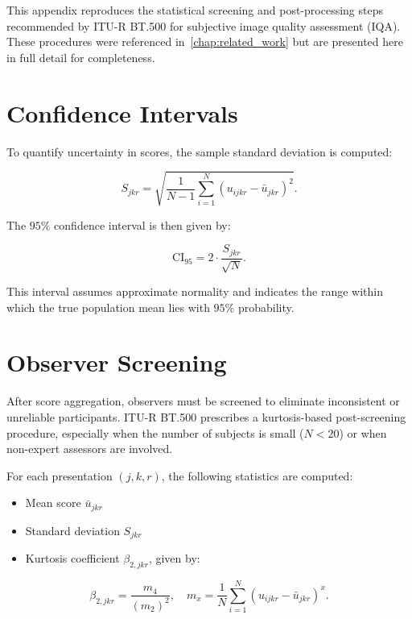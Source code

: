 This appendix reproduces the statistical screening and post-processing steps recommended by ITU-R BT.500 for subjective image quality assessment (IQA). These procedures were referenced in~\autoref{chap:related_work} but are presented here in full detail for completeness.

\section{Confidence Intervals}

To quantify uncertainty in scores, the sample standard deviation is computed:

\begin{equation}
S_{jkr} = \sqrt{\frac{1}{N - 1} \sum_{i=1}^{N} \left( u_{ijkr} - \bar{u}_{jkr} \right)^2}.
\end{equation}

The $95\%$ confidence interval is then given by:

\begin{equation}
\text{CI}_{95} = 2 \cdot \frac{S_{jkr}}{\sqrt{N}}.
\end{equation}

This interval assumes approximate normality and indicates the range within which the true population mean lies with $95\%$ probability.

\section{Observer Screening}

After score aggregation, observers must be screened to eliminate inconsistent or unreliable participants. ITU-R BT.500 prescribes a kurtosis-based post-screening procedure, especially when the number of subjects is small ($N < 20$) or when non-expert assessors are involved.

For each presentation $(j, k, r)$, the following statistics are computed:
\begin{itemize}
  \item Mean score $\bar{u}_{jkr}$  
  \item Standard deviation $S_{jkr}$  
  \item Kurtosis coefficient $\beta_{2,jkr}$, given by:
\end{itemize}

\begin{equation}
\beta_{2,jkr} = \frac{m_4}{(m_2)^2}, 
\quad 
m_x = \frac{1}{N} \sum_{i=1}^{N} \left( u_{ijkr} - \bar{u}_{jkr} \right)^x.
\end{equation}

